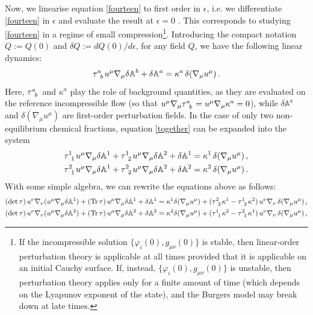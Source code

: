 \documentclass[a4paper, amsfonts, amssymb, amsmath, reprint, showkeys, nofootinbib, twoside, onecolumn,notitlepage]{revtex4-1}
\begin{document}
Now, we linearise equation \eqref{fourteen} to first order in $\epsilon$, i.e. we differentiate \eqref{fourteen} in $\epsilon$ and evaluate the result at $\epsilon=0$ \cite{Geroch_Lindblom_1991_causal}. This corresponds to studying \eqref{fourteen} in a regime of small compression\footnote{ If the incompressible solution $\{\varphi_i(0),g_{\mu \nu}(0)\}$ is stable, then linear-order perturbation theory is applicable at all times provided that it is applicable on an initial Cauchy surface. If, instead, $\{\varphi_i(0),g_{\mu \nu}(0)\}$ is unstable, then perturbation theory applies only for a finite amount of time (which depends on the Lyapunov exponent of the state), and the Burgers model may break down at late times.}. Introducing the compact notation $Q:=Q(0)$ and $\delta Q:= dQ(0)/d\epsilon$, for any field $Q$, we have the following linear dynamics:
\begin{equation}\label{together}
\tau\indices{^a_b} u^\mu \nabla_\mu \delta \mathbb{A}^b + \delta \mathbb{A}^a =\kappa^a \, \delta(\nabla_\mu  u^\mu) \, .
\end{equation}
Here, $\tau\indices{^a _b}$ and $\kappa^a$ play the role of background quantities, as they are evaluated on the reference incompressible flow (so that $u^\mu \nabla_\mu \tau\indices{^a _b} =u^\mu \nabla_\mu \kappa^a=0$), while $\delta \mathbb{A}^a$ and $\delta(\nabla_\mu  u^\mu)$ are first-order perturbation fields.
In the case of only two non-equilibrium chemical fractions, equation \eqref{together} can be expanded into the system
\begin{equation}
\begin{split}
\tau\indices{^1 _1} u^\mu \nabla_\mu \delta \mathbb{A}^1+\tau\indices{^1 _2} u^\mu \nabla_\mu \delta \mathbb{A}^2+ \delta \mathbb{A}^1 ={}& \kappa^1 \, \delta(\nabla_\mu  u^\mu) \, , \\
\tau\indices{^2 _1} u^\mu \nabla_\mu \delta \mathbb{A}^1+\tau\indices{^2 _2} u^\mu \nabla_\mu \delta \mathbb{A}^2+ \delta \mathbb{A}^2 ={}& \kappa^2  \, \delta(\nabla_\mu  u^\mu) \, .\\ 
\end{split}
\end{equation}
With some simple algebra, we can rewrite the equations above as follows:
\begin{equation}
\begin{split}
(\det \tau) \, u^\nu \nabla_\nu (u^\mu \nabla_\mu \delta\mathbb{A}^1) + (\text{Tr} \, \tau) \, u^\mu \nabla_\mu \delta \mathbb{A}^1 + \delta \mathbb{A}^1 ={}& \kappa^1 \delta(\nabla_\mu  u^\mu) +(\tau\indices{^2 _2 }\kappa^1-\tau\indices{^1 _2}\kappa^2)\, u^\nu \nabla_\nu  \, \delta(\nabla_\mu  u^\mu)\, , \\
(\det \tau) \, u^\nu \nabla_\nu (u^\mu \nabla_\mu \delta\mathbb{A}^2) + (\text{Tr} \, \tau) \, u^\mu \nabla_\mu \delta \mathbb{A}^2 + \delta \mathbb{A}^2 ={}& \kappa^2 \delta(\nabla_\mu u^\mu) +(\tau\indices{^1 _1 }\kappa^2-\tau\indices{^2 _1}\kappa^1)\, u^\nu \nabla_\nu  \, \delta(\nabla_\mu  u^\mu)\, , \\
\end{split}
\end{equation}
\end{document}
